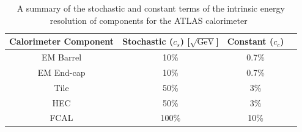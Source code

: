 
{\renewcommand{\arraystretch}{1.2}
\begin{table}[!htb]
\centering
\begin{tabular}{|c||c|c|c|}
\hline
\textbf{Calorimeter Component}  & \textbf{Stochastic ($c_s$) [$\sqrt{\text{GeV}}$]}  & \textbf{Constant ($c_c$)}  \\
\hline
EM Barrel              & 10\%                                       & 0.7\%       \\
EM End-cap             & 10\%                                       & 0.7\%       \\
Tile                   & 50\%                                       &   3\%       \\
HEC                    & 50\%                                       &   3\%       \\
FCAL                   & 100\%                                      &  10\%       \\
\hline
\end{tabular}
\caption[A summary of the stochastic and constant terms of the intrinsic energy resolution of components for the ATLAS calorimeter.]
        {A summary of the stochastic and constant terms of the intrinsic energy resolution of components for the ATLAS calorimeter~\cite{det-ATLAS_Exp}}
\label{tab:det-calo_noise}
\end{table}
}

